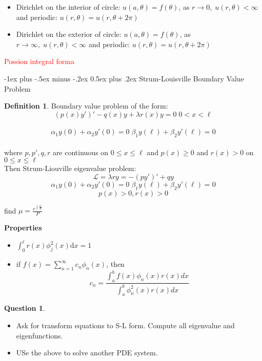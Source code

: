 \documentclass[10pt,landscape]{article}
\makeatletter
\renewcommand{\section}{\@startsection{section}{1}{0mm}%
                                {-1ex plus -.5ex minus -.2ex}%
                                {0.5ex plus .2ex}%
                                {\normalfont\large\bfseries}}
\newcommand\todo[1]{\textcolor{red}{#1}}
\theoremstyle{definition}
\newtheorem*{question}{Question}
\newtheorem*{method}{Method}
\newtheorem{defin}{Definition}
\theoremstyle{remark}
\makeatother
\begin{document}
\begin{multicols}{3}
\begin{itemize}[noitemsep,nolistsep]
\begin{method}
    \end{method}
    
    \item Dirichlet on the interior of circle: $u(a, \theta) = f(\theta)$, as $r \rightarrow 0, \; u(r, \theta) < \infty$ and periodic: $u(r, \theta) = u(r, \theta + 2\pi)$
    \item Dirichlet on the exterior of circle: $u(a, \theta) = f(\theta)$, as $r \rightarrow \infty, \; u(r, \theta) < \infty$ and periodic: $u(r, \theta) = u(r, \theta + 2\pi)$
\end{itemize}

\todo{Possion integral forma}


\section{Strum-Louisville Boundary Value Problem}
\begin{defin}
Boundary value problem of the form:
$$(p(x)y')' - q(x)y + \lambda r(x)y = 0\; 0 < x < \ell$$ \\
$$\alpha_1 y(0) + \alpha_2 y'(0) = 0 \; \beta_1 y(\ell) + \beta_2 y'(\ell) = 0$$  \\
where $p, p', q, r$ are continuous on $0 \leq x \leq \ell $ and $p(x) \geq 0$ and $r(x) >0 $ on $0 \leq x \leq \ell $ \\
Then Strum-Liouville eigenvalue problem: \\
$$\mathcal{L} = \lambda ry = -(py')' + qy$$
$$\alpha_1 y(0) + \alpha_2 y'(0) = 0 \; \beta_1 y(\ell) + \beta_2 y'(\ell) = 0$$
$$p(x) > 0, r(x) >0$$
\end{defin}
find $\mu = \frac{e^{\int \frac{Q}{P}}}{P}$

\textbf{Properties}
\begin{itemize} [noitemsep,nolistsep]
    \item $\int^{\ell}_0 r(x) \phi^2_j (x) \mathrm{d}x = 1$
    \item if $f(x) = \sum^{\infty}_{n=1}c_n\phi_n(x)$, then 
    $$c_n = \frac{\int^b_af(x)\phi_n(x)r(x)dx}{\int^b_a\phi^2_n(x)r(x)dx}$$
\end{itemize}

\begin{question}
\begin{itemize}
    \item Ask for transform equations to S-L form. Compute all eigenvalue and eigenfunctions.
    \item USe the above to solve another PDE system. 
\end{itemize}


\end{question}
\end{multicols}
\end{document}
